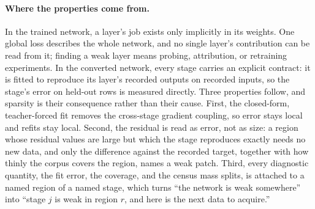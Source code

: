 \documentclass[11pt]{article}
\begin{document}
\paragraph{Where the properties come from.}
In the trained network, a layer's job exists only implicitly in
its weights. One global loss describes the whole network, and no
single layer's contribution can be read from it; finding a weak
layer means probing, attribution, or retraining experiments. In
the converted network, every stage carries an explicit contract:
it is fitted to reproduce its layer's recorded outputs on
recorded inputs, so the stage's error on held-out rows is
measured directly. Three properties follow, and sparsity is their
consequence rather than their cause. First, the closed-form,
teacher-forced fit removes the cross-stage gradient coupling, so
error stays local and refits stay local. Second, the residual is
read as error, not as size: a region whose residual values are
large but which the stage reproduces exactly needs no new data,
and only the difference against the recorded target, together
with how thinly the corpus covers the region, names a weak
patch. Third, every diagnostic quantity, the fit error, the
coverage, and the census mass splits, is attached to a named
region of a named stage, which turns ``the network is weak
somewhere'' into ``stage $j$ is weak in region $r$, and here is
the next data to acquire.''
\end{document}
